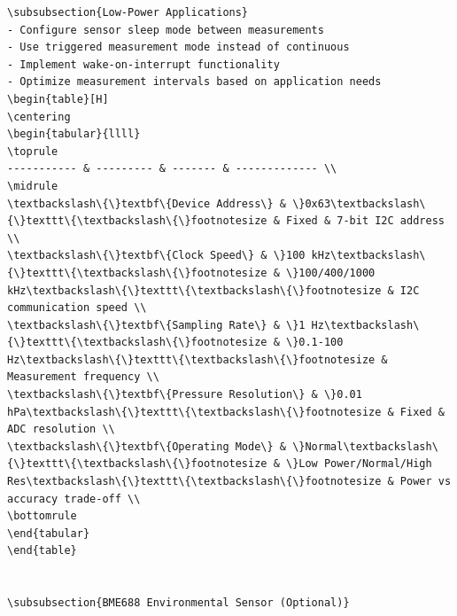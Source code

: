 \documentclass[11pt,a4paper]{article}
\begin{document}
\begin{lstlisting}[language=text]
\subsubsection{Low-Power Applications}
- Configure sensor sleep mode between measurements
- Use triggered measurement mode instead of continuous
- Implement wake-on-interrupt functionality
- Optimize measurement intervals based on application needs
\begin{table}[H]
\centering
\begin{tabular}{llll}
\toprule
----------- & --------- & ------- & ------------- \\
\midrule
\textbackslash\{\}textbf\{Device Address\} & \}0x63\textbackslash\{\}texttt\{\textbackslash\{\}footnotesize & Fixed & 7-bit I2C address \\
\textbackslash\{\}textbf\{Clock Speed\} & \}100 kHz\textbackslash\{\}texttt\{\textbackslash\{\}footnotesize & \}100/400/1000 kHz\textbackslash\{\}texttt\{\textbackslash\{\}footnotesize & I2C communication speed \\
\textbackslash\{\}textbf\{Sampling Rate\} & \}1 Hz\textbackslash\{\}texttt\{\textbackslash\{\}footnotesize & \}0.1-100 Hz\textbackslash\{\}texttt\{\textbackslash\{\}footnotesize & Measurement frequency \\
\textbackslash\{\}textbf\{Pressure Resolution\} & \}0.01 hPa\textbackslash\{\}texttt\{\textbackslash\{\}footnotesize & Fixed & ADC resolution \\
\textbackslash\{\}textbf\{Operating Mode\} & \}Normal\textbackslash\{\}texttt\{\textbackslash\{\}footnotesize & \}Low Power/Normal/High Res\textbackslash\{\}texttt\{\textbackslash\{\}footnotesize & Power vs accuracy trade-off \\
\bottomrule
\end{tabular}
\end{table}


\subsubsection{BME688 Environmental Sensor (Optional)}


\end{lstlisting}
\end{document}
